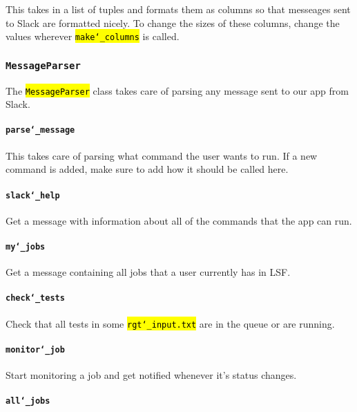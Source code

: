 \documentclass{article}
\newcommand{\un}[0]{\char`_}
\newcommand{\code}[1]{\textcolor{red}{\hl{\texttt{#1}}}}
\begin{document}
This takes in a list of tuples and formats them as columns so that messeages sent to Slack are formatted nicely. To change the sizes of these columns, change the values wherever \code{make\un columns} is called.

\subsubsection{\texttt{MessageParser}}

The \code{MessageParser} class takes care of parsing any message sent to our app from Slack.

\paragraph{\texttt{parse\un message}}

This takes care of parsing what command the user wants to run. If a new command is added, make sure to add how it should be called here.

\paragraph{\texttt{slack\un help}}

Get a message with information about all of the commands that the app can run.

\paragraph{\texttt{my\un jobs}}

Get a message containing all jobs that a user currently has in LSF.

\paragraph{\texttt{check\un tests}}

Check that all tests in some \code{rgt\un input.txt} are in the queue or are running.

\paragraph{\texttt{monitor\un job}}

Start monitoring a job and get notified whenever it's status changes.

\paragraph{\texttt{all\un jobs}}
\end{document}
